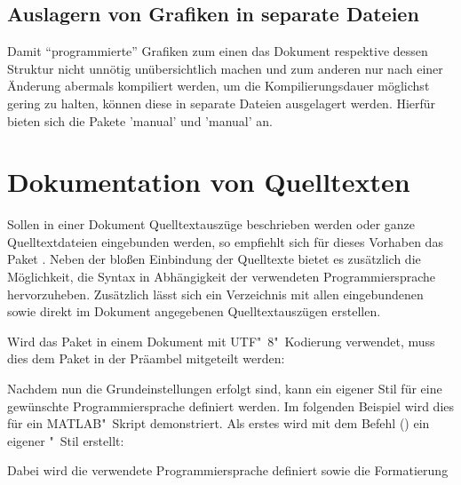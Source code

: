 \documentclass[%
  english,ngerman,%
  cdgeometry=no,DIV=12,%
  cd=false,cdfont=false,cdtitle=true,%
  headings=normal,%
  automark,%
  listof=toc,%
]{tudscrartcl}
\begin{document}
\subsection{Auslagern von Grafiken in separate Dateien}
Damit \enquote{programmierte} Grafiken zum einen das Dokument respektive dessen 
Struktur nicht unnötig unübersichtlich machen und zum anderen nur nach einer 
Änderung abermals kompiliert werden, um die Kompilierungsdauer möglichst gering 
zu halten, können diese in separate Dateien ausgelagert werden. Hierfür bieten 
sich die Pakete 'manual' und 'manual' an.



\section{Dokumentation von Quelltexten}
Sollen in einer Dokument Quelltextauszüge beschrieben werden oder ganze 
Quelltextdateien eingebunden werden, so empfiehlt sich für dieses Vorhaben das 
Paket . Neben der bloßen Einbindung der Quelltexte bietet es 
zusätzlich die Möglichkeit, die Syntax in Abhängigkeit der verwendeten 
Programmiersprache hervorzuheben. Zusätzlich lässt sich ein Verzeichnis mit 
allen eingebundenen sowie direkt im Dokument angegebenen Quelltextauszügen 
erstellen.
%
\begin{Hint}
\usepackage{listings}
\end{Hint}
%
Wird das Paket in einem Dokument mit UTF"~8"~Kodierung verwendet, muss dies dem 
Paket in der Präambel mitgeteilt werden:
%
\begin{Hint}
\end{Hint}
%
Nachdem nun die Grundeinstellungen erfolgt sind, kann ein eigener Stil für eine 
gewünschte Programmiersprache definiert werden. Im folgenden Beispiel wird dies 
für ein MATLAB"~Skript demonstriert. Als erstes wird mit dem Befehl 
() ein eigener "~Stil 
erstellt:
%
\begin{Hint*}
\end{Hint*}
%
Dabei wird die verwendete Programmiersprache definiert sowie die Formatierung 
\end{document}
